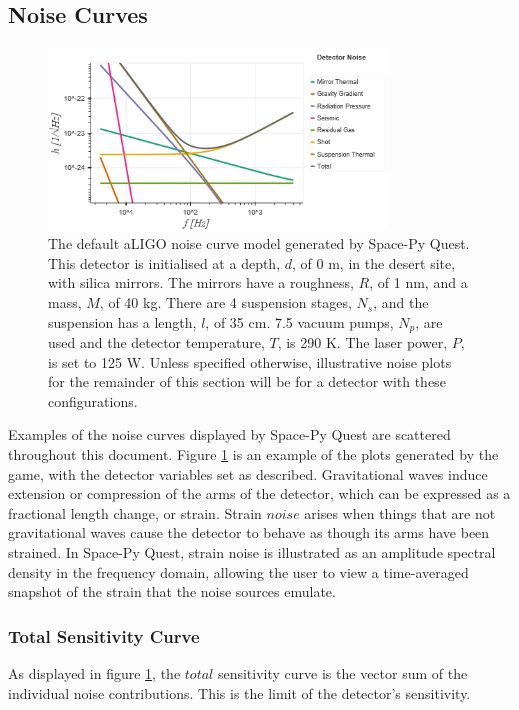 \documentclass{article}
\begin{document}
\subsection{Noise Curves}
\begin{figure}
\centering
\includegraphics[width=0.8\textwidth]{SPQ_aLIGO.png}
\caption{The default aLIGO noise curve model generated by Space-Py Quest. This detector is initialised at a depth, $d$, of 0 m, in the desert site, with silica mirrors. The mirrors have a roughness, $R$, of 1 nm, and a mass, $M$, of 40 kg. There are 4 suspension stages, $N_s$, and the suspension has a length, $l$, of 35 cm. 7.5 vacuum pumps, $N_p$, are used and the detector temperature, $T$, is 290 K. The laser power, $P$, is set to 125 W. Unless specified otherwise, illustrative noise plots for the remainder of this section will be for a detector with these configurations.}
\label{fig:aLIGO}
\end{figure}
Examples of the noise curves displayed by Space-Py Quest are scattered throughout this document. Figure \ref{fig:aLIGO} is an example of the plots generated by the game, with the detector variables set as described. Gravitational waves induce extension or compression of the arms of the detector, which can be expressed as a fractional length change, or strain. Strain $noise$ arises when things that are not gravitational waves cause the detector to behave as though its arms have been strained. In Space-Py Quest, strain noise is illustrated as an amplitude spectral density in the frequency domain, allowing the user to view a time-averaged snapshot of the strain that the noise sources emulate.
\subsubsection{Total Sensitivity Curve}
As displayed in figure \ref{fig:aLIGO}, the $total$ sensitivity curve is the vector sum of the individual noise contributions. This is the limit of the detector's sensitivity.
\end{document}
